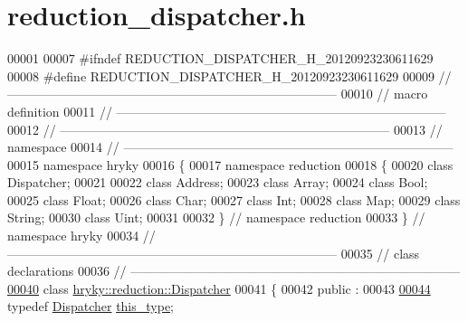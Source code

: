 \hypertarget{reduction__dispatcher_8h_source}{\section{reduction\-\_\-dispatcher.\-h}
}

\begin{DoxyCode}
00001 
00007 \textcolor{preprocessor}{#ifndef REDUCTION\_DISPATCHER\_H\_20120923230611629}
00008 \textcolor{preprocessor}{}\textcolor{preprocessor}{#define REDUCTION\_DISPATCHER\_H\_20120923230611629}
00009 \textcolor{preprocessor}{}\textcolor{comment}{//
      ------------------------------------------------------------------------------}
00010 \textcolor{comment}{// macro definition}
00011 \textcolor{comment}{//
      ------------------------------------------------------------------------------}
00012 \textcolor{comment}{//
      ------------------------------------------------------------------------------}
00013 \textcolor{comment}{// namespace}
00014 \textcolor{comment}{//
      ------------------------------------------------------------------------------}
00015 \textcolor{keyword}{namespace }hryky
00016 \{
00017 \textcolor{keyword}{namespace }reduction
00018 \{
00020     \textcolor{keyword}{class }Dispatcher;
00021 
00022     \textcolor{keyword}{class }Address;
00023     \textcolor{keyword}{class }Array;
00024     \textcolor{keyword}{class }Bool;
00025     \textcolor{keyword}{class }Float;
00026     \textcolor{keyword}{class }Char;
00027     \textcolor{keyword}{class }Int;
00028     \textcolor{keyword}{class }Map;
00029     \textcolor{keyword}{class }String;
00030     \textcolor{keyword}{class }Uint;
00031 
00032 \} \textcolor{comment}{// namespace reduction}
00033 \} \textcolor{comment}{// namespace hryky}
00034 \textcolor{comment}{//
      ------------------------------------------------------------------------------}
00035 \textcolor{comment}{// class declarations}
00036 \textcolor{comment}{//
      ------------------------------------------------------------------------------}
\hypertarget{reduction__dispatcher_8h_source_l00040}{}\hyperlink{classhryky_1_1reduction_1_1_dispatcher}{00040} \textcolor{comment}{}\textcolor{keyword}{class }\hyperlink{classhryky_1_1reduction_1_1_dispatcher}{hryky::reduction::Dispatcher}
00041 \{
00042 \textcolor{keyword}{public} :
00043 
\hypertarget{reduction__dispatcher_8h_source_l00044}{}\hyperlink{classhryky_1_1reduction_1_1_dispatcher_a8a3ef8b3aa55fc7139de687a9be4f693}{00044}     \textcolor{keyword}{typedef} \hyperlink{classhryky_1_1reduction_1_1_dispatcher}{Dispatcher} \hyperlink{classhryky_1_1reduction_1_1_dispatcher_a8a3ef8b3aa55fc7139de687a9be4f693}{this_type};

\end{DoxyCode}
